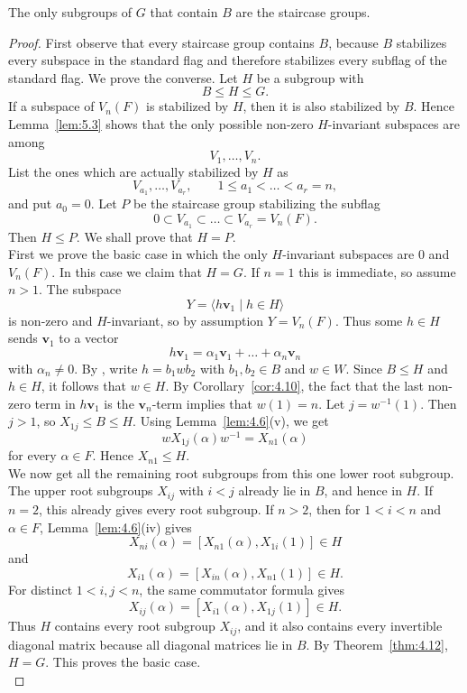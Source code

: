 \documentclass[../Odyssey_Project.tex]{subfiles}
\begin{document}
\begin{theorem}
\label{thm:5.4}
The only subgroups of $G$ that contain $B$ are the staircase groups.
\end{theorem}
\begin{proof}
First observe that every staircase group contains $B$, because $B$ stabilizes every subspace in the standard flag and therefore stabilizes every subflag of the standard flag. We prove the converse. Let $H$ be a subgroup with
\[
    B \leq H \leq G.
\]
If a subspace of $V_n(F)$ is stabilized by $H$, then it is also stabilized by $B$. Hence Lemma~\ref{lem:5.3} shows that the only possible non-zero $H$-invariant subspaces are among
\[
    V_1,\dots,V_n.
\]
List the ones which are actually stabilized by $H$ as
\[
    V_{a_1},\dots,V_{a_r},
    \qquad
    1\leq a_1<\dots<a_r=n,
\]
and put $a_0=0$. Let $P$ be the staircase group stabilizing the subflag
\[
    0\subset V_{a_1}\subset\dots\subset V_{a_r}=V_n(F).
\]
Then $H\leq P$. We shall prove that $H=P$.\\
First we prove the basic case in which the only $H$-invariant subspaces are $0$ and $V_n(F)$. In this case we claim that $H=G$. If $n=1$ this is immediate, so assume $n>1$. The subspace
\[
    Y=\langle h\mathbf{v}_1\mid h\in H\rangle
\]
is non-zero and $H$-invariant, so by assumption $Y=V_n(F)$. Thus some $h\in H$ sends $\mathbf{v}_1$ to a vector
\[
    h\mathbf{v}_1=\alpha_1\mathbf{v}_1+\dots+\alpha_n\mathbf{v}_n
\]
with $\alpha_n\neq 0$. By , write $h=b_1wb_2$ with $b_1,b_2\in B$ and $w\in W$. Since $B\leq H$ and $h\in H$, it follows that $w\in H$. By Corollary~\ref{cor:4.10}, the fact that the last non-zero term in $h\mathbf{v}_1$ is the $\mathbf{v}_n$-term implies that $w(1)=n$. Let $j=w^{-1}(1)$. Then $j>1$, so $X_{1j}\leq B\leq H$. Using Lemma~\ref{lem:4.6}(v), we get
\[
    wX_{1j}(\alpha)w^{-1}=X_{n1}(\alpha)
\]
for every $\alpha\in F$. Hence $X_{n1}\leq H$.\\
We now get all the remaining root subgroups from this one lower root subgroup. The upper root subgroups $X_{ij}$ with $i<j$ already lie in $B$, and hence in $H$. If $n=2$, this already gives every root subgroup. If $n>2$, then for $1<i<n$ and $\alpha\in F$, Lemma~\ref{lem:4.6}(iv) gives
\[
    X_{ni}(\alpha)=[X_{n1}(\alpha),X_{1i}(1)]\in H
\]
and
\[
    X_{i1}(\alpha)=[X_{in}(\alpha),X_{n1}(1)]\in H.
\]
For distinct $1<i,j<n$, the same commutator formula gives
\[
    X_{ij}(\alpha)=[X_{i1}(\alpha),X_{1j}(1)]\in H.
\]
Thus $H$ contains every root subgroup $X_{ij}$, and it also contains every invertible diagonal matrix because all diagonal matrices lie in $B$. By Theorem~\ref{thm:4.12}, $H=G$. This proves the basic case.\\

\end{proof}
\end{document}
